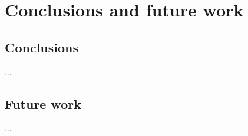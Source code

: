 \chapter{Conclusions and future work}
\label{cha:conclusions}

\section{Conclusions}
...

\section{Future work}
...